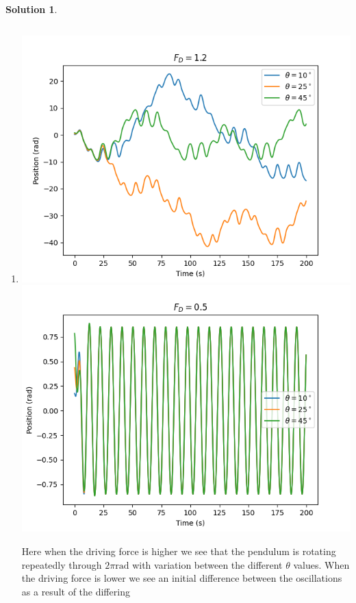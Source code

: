 \documentclass[10pt]{article}
\theoremstyle{definition}
\newtheorem{soln}{Solution}
\begin{document}
\begin{soln}~
      \begin{enumerate}[label=(\alph*)]
            \item \inputminted[breaklines, autogobble]{python3}{./python/q2/q2a.py}
                  \begin{center}
                        \includegraphics[scale=0.75]{Figure_5-1.png}
                        \includegraphics[scale=0.75]{Figure_5-2.png}
                  \end{center}
                  Here when the driving force is higher we see that the pendulum is rotating repeatedly through $2\pi\unit{\radian}$ with variation between
                  the different $\theta$ values. When the driving force is lower we see an initial difference between the oscillations as a result of the differing

\end{enumerate}
\end{soln}
\end{document}
